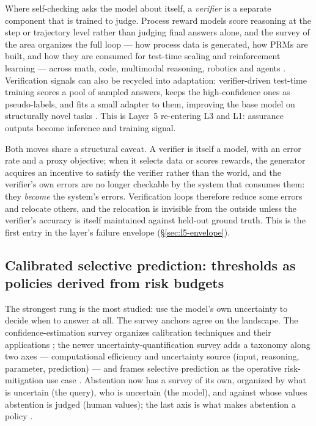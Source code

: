 Where self-checking asks the model about itself, a \emph{verifier} is a separate component
that is trained to judge. Process reward models score reasoning at the step or trajectory level rather
than judging final answers alone, and the survey of the area organizes the full loop --- how
process data is generated, how PRMs are built, and how they are consumed for test-time scaling
and reinforcement learning --- across math, code, multimodal reasoning, robotics and agents
\cite{id251008049} \evsynth{}. Verification signals can also be recycled into adaptation:
verifier-driven test-time training scores a pool of sampled answers, keeps the high-confidence
ones as pseudo-labels, and fits a small adapter to them, improving the base model on
structurally novel tasks \cite{id250519475} \evaurep{}. This is Layer~5 re-entering L3 and
L1: assurance outputs become inference and training signal.

Both moves share a structural caveat. A verifier is itself a model, with an error rate and a
proxy objective; when it selects data or scores rewards, the generator acquires an incentive to
satisfy the verifier rather than the world, and the verifier's own errors are no longer
checkable by the system that consumes them: they \emph{become} the system's errors.
Verification loops therefore reduce some errors and relocate others, and the relocation is
invisible from the outside unless the verifier's accuracy is itself maintained against
held-out ground truth. This is the first entry in the layer's failure envelope
(\S\ref{sec:l5-envelope}).

\subsection{Calibrated selective prediction: thresholds as policies derived from risk budgets}
\label{sec:l5-calibrated}

The strongest rung is the most studied: use the model's own uncertainty to decide when to answer
at all. The survey anchors agree on the landscape. The confidence-estimation survey organizes
calibration techniques and their applications \cite{id231108298}; the newer
uncertainty-quantification survey adds a taxonomy along two axes --- computational efficiency
and uncertainty source (input, reasoning, parameter, prediction) --- and frames selective
prediction as the operative risk-mitigation use case \cite{id250315850}. Abstention now has a
survey of its own, organized by what is uncertain (the query), who is uncertain (the model), and
against whose values abstention is judged (human values); the last axis is what makes abstention
a policy \cite{id240718418} \evsynth{}.

